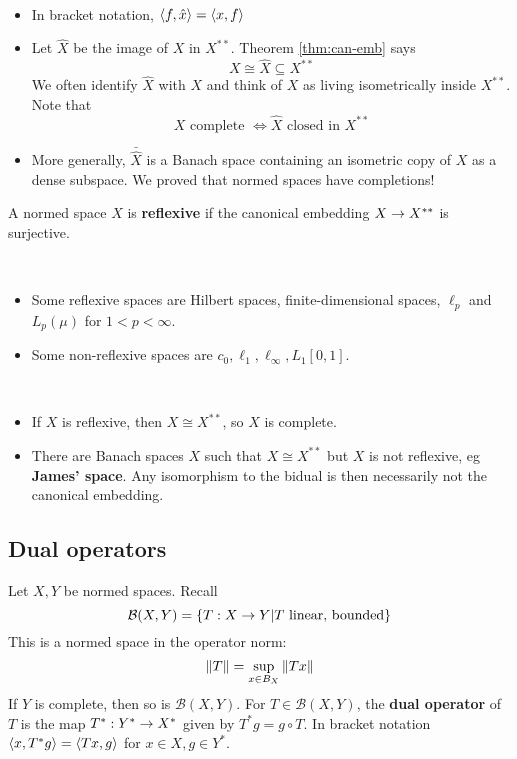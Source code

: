 \documentclass{article}
\begin{document}
\begin{rmks}~
  \begin{itemize}
    \item In bracket notation, $\left\langle f, \hat x\right\rangle = \left\langle x, f\right\rangle$
    \item Let $\hat X$ be the image of $X$ in $X^{**}$. Theorem \ref{thm:can-emb} says
      $$X \cong \hat X \subseteq X^{**}$$
      We often identify $\hat X$ with $X$ and think of $X$ as living isometrically inside $X^{**}$. Note that
      $$X \text{ complete } \iff \hat X \text{ closed in } X^{**}$$
    \item More generally, $\bar{\hat X}$ is a Banach space containing an isometric copy of $X$ as a dense subspace. We proved that normed spaces have completions!
  \end{itemize}
\end{rmks}

\begin{defi}
  A normed space $X$ is {\bf reflexive} if the canonical embedding $X \rightarrow X^{**}$ is surjective.
\end{defi}

\begin{egs}~
  \begin{itemize}
    \item Some reflexive spaces are Hilbert spaces, finite-dimensional spaces, $\ell_p$ and $L_p(\mu)$ for $1 < p < \infty$.
    \item Some non-reflexive spaces are $c_0, \ell_1, \ell_\infty, L_1[0, 1]$.
  \end{itemize}
\end{egs}

\begin{rmks}~
  \begin{itemize}
  \item If $X$ is reflexive, then $X \cong X^{**}$, so $X$ is complete.
  \item There are Banach spaces $X$ such that $X \cong X^{**}$ but $X$ is not reflexive, eg {\bf James' space}. Any isomorphism to the bidual is then necessarily not the canonical embedding.
  \end{itemize}
\end{rmks}

\subsection{Dual operators}

\newlec

Let $X, Y$ be normed spaces. Recall
$$\mathcal B(X, Y) = \{T : X \rightarrow Y | T \text{ linear, bounded}\}$$
This is a normed space in the operator norm:
$$\left\lVert T\right\rVert = \sup_{x \in B_X} \left\lVert Tx\right\rVert$$
If $Y$ is complete, then so is $\mathcal B(X, Y)$. For $T \in \mathcal B(X, Y)$, the {\bf dual operator} of $T$ is the map $T^* : Y^* \rightarrow X^*$ given by $T^*g = g \circ T$. In bracket notation $\left\langle x, T^*g\right\rangle = \left\langle Tx, g\right\rangle$ for $x \in X, g \in Y^*$.
\end{document}
